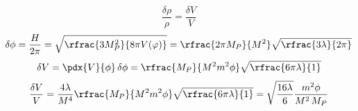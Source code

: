 \[ \frac{\delta\rho}{\rho} = \frac{\delta V}{V} \]
\[ \delta \phi = \frac{H}{2\pi} = \sqrt{\rfrac{3 M_P^2}{8 \pi V(\varphi)}} = \rfrac{2\pi M_P}{M^2} \sqrt{\rfrac{3\lambda}{2\pi}} \]
\[ \delta V = \pdx{V}{\phi} \, \delta\phi = \rfrac{M_P}{M^2 m^2 \phi} \sqrt{\rfrac{6\pi\lambda}{1}} \]
\[ \frac{\delta V}{V} = \frac{4\lambda}{M^4} \rfrac{M_P}{M^2 m^2 \phi} \sqrt{\rfrac{6\pi\lambda}{1}} = \sqrt{\frac{16\lambda}{6}} \frac{m^2 \phi}{M^2 \, M_P} \]